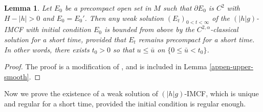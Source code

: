 \documentclass[11pt, letterpaper]{amsart}
\newtheorem{lem}[thm]{Lemma}
\theoremstyle{definition}
\theoremstyle{remark}
\begin{document}
\begin{lem}\label{lem-upper-smooth}
	Let $E_0$ be a precompact open set in $M$ such that $\partial E_0$ is $C^2$ with $H- |h|>0$ and $E_0 = E_0'$. Then any weak solution $(E_t)_{0<t<\infty}$ of the $(|h|g)$-IMCF with initial condition $E_0$ is bounded from above by the $C^{2,\alpha }$-classical solution for a short time, provided that $E_t$ remains precompact for a short time. In other words, there exists $t_0>0$ so that $u \leq \bar{u}$ on $\{0 \leq \bar{u} < t_0\} $.
\end{lem}

\begin{proof}
	The proof is a modification of \cite[Theorem 2.2]{HI01}, and is included in Lemma \ref{appen-upper-smooth}.
\end{proof}

Now we prove the existence of a weak solution of $(|h|g)$-IMCF, which is unique and regular for a short time, provided the initial condition is regular enough.
\end{document}
